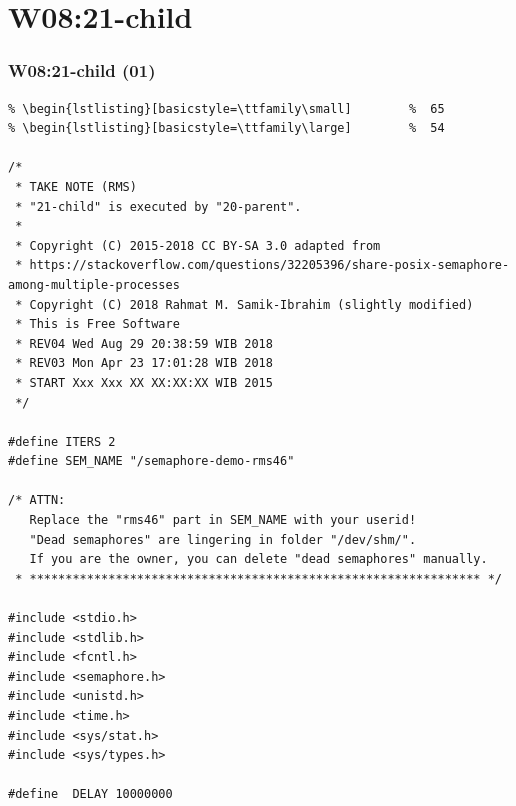 \documentclass[aspectratio=169, xcolor=table, notheorems, hyperref={pdfpagelabels=false}]{beamer}
\begin{document}
\section{W08:21-child}
\begin{frame}[fragile]
\frametitle{W08:21-child (01)}
\begin{lstlisting}[basicstyle=\ttfamily\tiny]         % 108
% \begin{lstlisting}[basicstyle=\ttfamily\footnotesize] %  72
% \begin{lstlisting}[basicstyle=\ttfamily\small]        %  65
% \begin{lstlisting}[basicstyle=\ttfamily\large]        %  54

/*
 * TAKE NOTE (RMS)
 * "21-child" is executed by "20-parent".
 *
 * Copyright (C) 2015-2018 CC BY-SA 3.0 adapted from 
 * https://stackoverflow.com/questions/32205396/share-posix-semaphore-among-multiple-processes
 * Copyright (C) 2018 Rahmat M. Samik-Ibrahim (slightly modified)
 * This is Free Software
 * REV04 Wed Aug 29 20:38:59 WIB 2018
 * REV03 Mon Apr 23 17:01:28 WIB 2018
 * START Xxx Xxx XX XX:XX:XX WIB 2015
 */

#define ITERS 2
#define SEM_NAME "/semaphore-demo-rms46"

/* ATTN:
   Replace the "rms46" part in SEM_NAME with your userid!
   "Dead semaphores" are lingering in folder "/dev/shm/".
   If you are the owner, you can delete "dead semaphores" manually.
 * *************************************************************** */

#include <stdio.h>
#include <stdlib.h>
#include <fcntl.h>
#include <semaphore.h>
#include <unistd.h>
#include <time.h>
#include <sys/stat.h>
#include <sys/types.h>

#define  DELAY 10000000

\end{lstlisting}
\end{frame}
\end{document}

